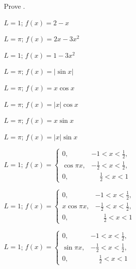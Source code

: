 \begin{exerciselist}


\item\label{exer:11.2.1}Prove .


\item\label{exer:11.2.2}\Cex $L=1$;  \quad $f(x)=2-x$

\item\label{exer:11.2.3}$L=\pi$;  \quad$f(x)=2x-3x^2$

\item\label{exer:11.2.4}$L=1$;  \quad$f(x)=1-3x^2$

\item\label{exer:11.2.5}$L=\pi$;  \quad$f(x)=|\sin x|$

\item\label{exer:11.2.6}\Cex $L=\pi$;  \quad$f(x)=x\cos x$

\item\label{exer:11.2.7}$L=\pi$;  \quad$f(x)=|x|\cos x$

\item\label{exer:11.2.8}\Cex $L=\pi$;  \quad$f(x)=x\sin x$

\item\label{exer:11.2.9}$L=\pi$;  \quad$f(x)=|x|\sin x$

\item\label{exer:11.2.10}$L=1$;  \quad$f(x)=
\begin{cases}
0,&-1<x<\frac{1}{2},\\
\cos\pi x,&-\frac{1}{2}<x<\frac{1}{2},\\
0,&\phantom{-}\frac{1}{2}<x<1
\end{cases}$

\item\label{exer:11.2.11}$L=1$;  \quad$f(x)=
\begin{cases}
0,&-1<x<\frac{1}{2},\\
x\cos\pi x,&-\frac{1}{2}<x<\frac{1}{2},\\
0,&\phantom{-}\frac{1}{2}<x<1
\end{cases}$

\item\label{exer:11.2.12}$L=1$;  \quad$f(x)=
\begin{cases}
0,&-1<x<\frac{1}{2},\\
\sin\pi x,&-\frac{1}{2}<x<\frac{1}{2},\\
0,&\phantom{-}\frac{1}{2}<x<1
\end{cases}$


\end{exerciselist}
